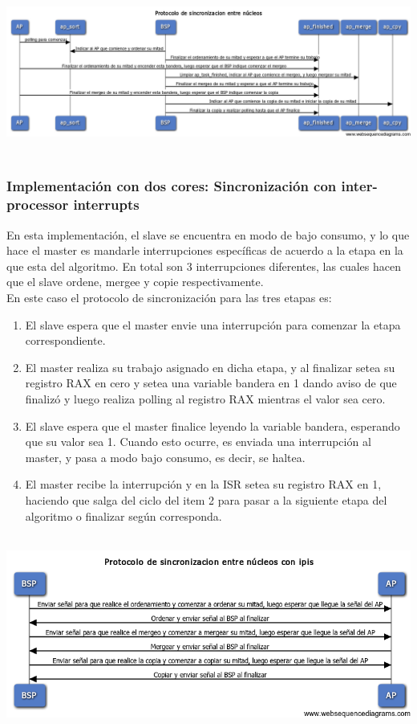    	\begin{center}
        \includegraphics[height=5.5cm]{images/sync-sorting-seq.png}
    \end{center}

    \subsubsection{Implementación con dos cores: Sincronización con inter-processor interrupts}
    	En esta implementación, el slave se encuentra en modo de bajo consumo, y lo que hace el master es mandarle interrupciones específicas de acuerdo a la etapa en la que esta del algoritmo. En total son 3 interrupciones diferentes, las cuales hacen que el slave ordene, mergee y copie respectivamente.\\

    	En este caso el protocolo de sincronización para las tres etapas es:
    	\begin{enumerate}
    		\item El slave espera que el master envie una interrupción para comenzar la etapa correspondiente.
    		\item El master realiza su trabajo asignado en dicha etapa, y al finalizar setea su registro RAX en cero y setea una variable bandera en 1 dando aviso de que finalizó y luego realiza polling al registro RAX mientras el valor sea cero.
    		\item El slave espera que el master finalice leyendo la variable bandera, esperando que su valor sea 1. Cuando esto ocurre, es enviada una interrupción al master, y pasa a modo bajo consumo, es decir, se haltea.
    		\item El master recibe la interrupción y en la ISR setea su registro RAX en 1, haciendo que salga del ciclo del item 2 para pasar a la siguiente etapa del algoritmo o finalizar según corresponda.    		
    	\end{enumerate}


   	\begin{center}
        \includegraphics[height=6.5cm]{images/ipis-sorting-seq.png}
    \end{center}
